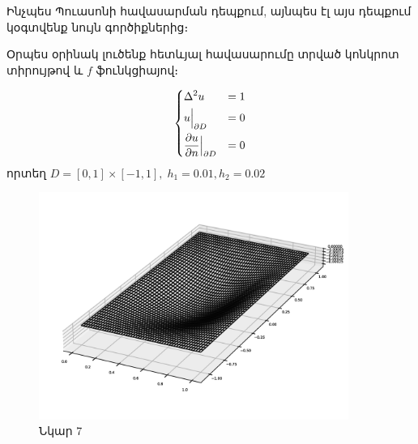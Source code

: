 \documentclass[fleqn, bachelor,subf,12pt,notitlepage]{disser}
\begin{document}
Ինչպես Պուասոնի հավասարման դեպքում, այնպես էլ այս դեպքում կօգտվենք նույն գործիքներից։

Օրպես օրինակ լուծենք հետևյալ հավասարումը տրված կոնկրոտ տիրույթով և $f$ ֆունկցիայով։

$$\begin{dcases}
								\Delta^{2} u &=1 \\
								u \Big |_{\partial D} &= 0\\
								\dfrac{\partial u}{\partial n} \Big |_{\partial D} &= 0
\end{dcases}$$
որտեղ $D = \left[0, 1\right] \times \left[-1, 1\right], \; h_{1}=0.01, h_{2}=0.02$


\begin{figure}[h!]
\centering
\includegraphics[width=0.9\textwidth]{images/biharmonic_equation_solution}
\captionsetup{labelformat=empty}
\caption{\hfill Նկար 7}
\end{figure}
\end{document}
